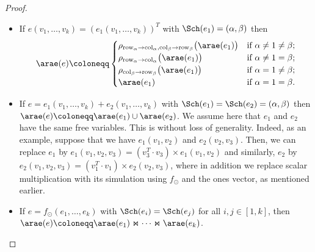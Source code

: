 \begin{proof}
\begin{itemize}

  \item If $e(v_1,\ldots,v_k)=(e_1(v_1,\ldots,v_k))^T$ with $\Sch (e_1)=(\alpha, \beta)$ then \[
\arae(e) \coloneqq 
\begin{cases}
\rho_{\mathrm{row}_\alpha \to \mathrm{col}_\alpha,\mathrm{col}_\beta \to \mathrm{row}_\beta}\bigl(\arae(e_1)\bigr) & \text{if } \alpha \neq 1 \neq \beta; \cr
\rho_{\mathrm{row}_\alpha \to \mathrm{col}_\alpha}\bigl(\arae(e_1)\bigr) & \text{if } \alpha \neq 1 = \beta; \cr
\rho_{\mathrm{col}_\beta \to \mathrm{row}_\beta}\bigl(\arae(e_1)\bigr) & \text{if } \alpha = 1 \neq \beta; \cr
\arae(e_1) & \text{if } \alpha = 1 = \beta.
\end{cases}
\]
\item If $e=e_1(v_1,\ldots,v_k)+e_2(v_1,\ldots,v_k)$ with $\Sch (e_1)=\Sch (e_2)=(\alpha, \beta)$ then $\arae (e)\coloneqq \arae (e_1)\cup \arae (e_2)$. We assume here that $e_1$ and $e_2$ have the same free variables. This is without loss of generality. Indeed, as an example, suppose that we have $e_1(v_1,v_2)$
and $e_2(v_2,v_3)$. Then, we can replace $e_1$ by  $e_1(v_1,v_2,v_3)=(v_3^T\cdot v_3)\times e_1(v_1,v_2)$
and similarly, $e_2$ by $e_2(v_1,v_2,v_3)=(v_1^T\cdot v_1)\times e_2(v_2,v_3)$, where in addition we replace scalar multiplication with its simulation using $f_{\odot}$ and the ones vector, as mentioned earlier. 
  \item If $e=f_\odot(e_1,\ldots, e_k)$ with $\Sch(e_i)=\Sch(e_j)$ for all $i,j\in[1,k]$, then $\arae(e)\coloneqq \arae(e_1)\Join \cdots \Join\arae(e_k)$.


\end{itemize}
\end{proof}
